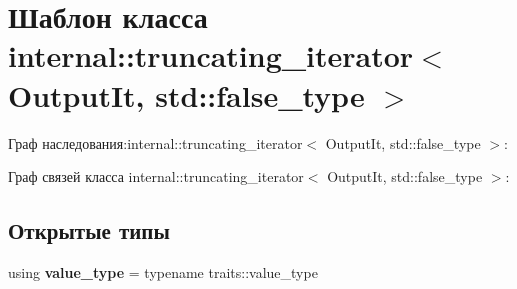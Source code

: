 \hypertarget{classinternal_1_1truncating__iterator_3_01OutputIt_00_01std_1_1false__type_01_4}{}\section{Шаблон класса internal\+:\+:truncating\+\_\+iterator$<$ Output\+It, std\+:\+:false\+\_\+type $>$}
\label{classinternal_1_1truncating__iterator_3_01OutputIt_00_01std_1_1false__type_01_4}


Граф наследования\+:internal\+:\+:truncating\+\_\+iterator$<$ Output\+It, std\+:\+:false\+\_\+type $>$\+:


Граф связей класса internal\+:\+:truncating\+\_\+iterator$<$ Output\+It, std\+:\+:false\+\_\+type $>$\+:
\subsection*{Открытые типы}
\begin{DoxyCompactItemize}
\item 
\mbox{\label{classinternal_1_1truncating__iterator_3_01OutputIt_00_01std_1_1false__type_01_4_a237077f80e5d59c93bbe598d26e18edd}} 
using {\bfseries value\+\_\+type} = typename traits\+::value\+\_\+type
\end{DoxyCompactItemize}
